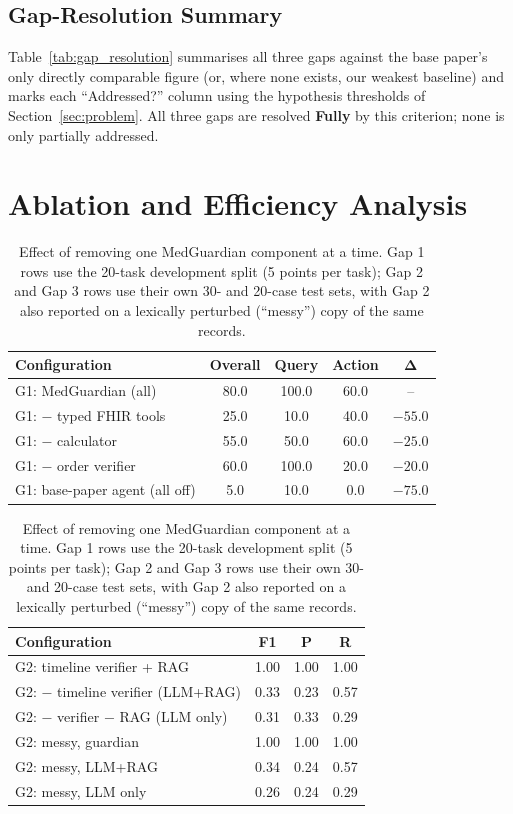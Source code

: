 \documentclass[conference]{IEEEtran}
\begin{document}
\subsection{Gap-Resolution Summary}
Table~\ref{tab:gap_resolution} summarises all three gaps against the base paper's only directly comparable figure (or, where none exists, our weakest baseline) and marks each ``Addressed?'' column using the hypothesis thresholds of Section~\ref{sec:problem}. All three gaps are resolved \textbf{Fully} by this criterion; none is only partially addressed.

\section{Ablation and Efficiency Analysis}\label{sec:ablation}

\begin{table}[t]
\centering
\small
\caption{Effect of removing one MedGuardian component at a time. Gap 1 rows use the 20-task development split (5 points per task); Gap 2 and Gap 3 rows use their own 30- and 20-case test sets, with Gap 2 also reported on a lexically perturbed (``messy'') copy of the same records.}
\label{tab:ablation}
\setlength{\tabcolsep}{4pt}
\begin{tabular}{lcccc}
\toprule
\textbf{Configuration} & \textbf{Overall} & \textbf{Query} & \textbf{Action} & $\boldsymbol{\Delta}$ \\
\midrule
G1: MedGuardian (all) & 80.0 & 100.0 & 60.0 & -- \\
G1: $-$ typed FHIR tools & 25.0 & 10.0 & 40.0 & $-55.0$ \\
G1: $-$ calculator & 55.0 & 50.0 & 60.0 & $-25.0$ \\
G1: $-$ order verifier & 60.0 & 100.0 & 20.0 & $-20.0$ \\
G1: base-paper agent (all off) & 5.0 & 10.0 & 0.0 & $-75.0$ \\
\bottomrule
\end{tabular}

\vspace{4pt}
\begin{tabular}{lccc}
\toprule
\textbf{Configuration} & \textbf{F1} & \textbf{P} & \textbf{R} \\
\midrule
G2: timeline verifier + RAG & 1.00 & 1.00 & 1.00 \\
G2: $-$ timeline verifier (LLM+RAG) & 0.33 & 0.23 & 0.57 \\
G2: $-$ verifier $-$ RAG (LLM only) & 0.31 & 0.33 & 0.29 \\
G2: messy, guardian & 1.00 & 1.00 & 1.00 \\
G2: messy, LLM+RAG & 0.34 & 0.24 & 0.57 \\
G2: messy, LLM only & 0.26 & 0.24 & 0.29 \\
\bottomrule
\end{tabular}


\end{table}
\end{document}
